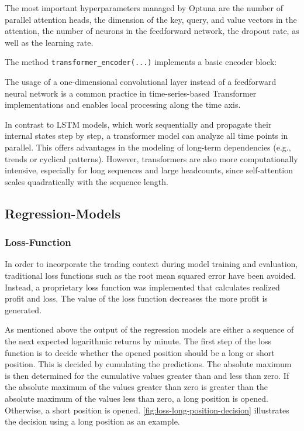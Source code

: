 The most important hyperparameters managed by Optuna are the number of parallel attention heads, the dimension of the key, query, and value vectors in the attention, the number of neurons in the feedforward network, the dropout rate, as well as the learning rate.

The method \verb|transformer_encoder(...)| implements a basic encoder block:



The usage of a one-dimensional convolutional layer instead of a feedforward neural network is a common practice in time-series-based Transformer implementations and enables local processing along the time axis.

In contrast to LSTM models, which work sequentially and propagate their internal states step by step, a transformer model can analyze all time points in parallel.
This offers advantages in the modeling of long-term dependencies (e.g., trends or cyclical patterns).
However, transformers are also more computationally intensive, especially for long sequences and large headcounts, since self-attention scales quadratically with the sequence length.

\subsection{Regression-Models}

\subsubsection{Loss-Function}

In order to incorporate the trading context during model training and evaluation, traditional loss functions such as the root mean squared error have been avoided.
Instead, a proprietary loss function was implemented that calculates realized profit and loss.
The value of the loss function decreases the more profit is generated.

As mentioned above the output of the regression models are either a sequence of the next expected logarithmic returns by minute.
The first step of the loss function is to decide whether the opened position should be a long or short position.
This is decided by cumulating the predictions.
The absolute maximum is then determined for the cumulative values greater than and less than zero.
If the absolute maximum of the values greater than zero is greater than the absolute maximum of the values less than zero, a long position is opened.
Otherwise, a short position is opened.
\autoref{fig:loss-long-position-decision} illustrates the decision using a long position as an example.

